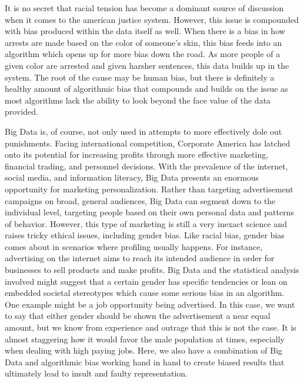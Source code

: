 \documentclass[sigconf]{acmart}
\begin{document}
It is no secret that racial tension has become a dominant source of discussion when it comes to the american justice system. However, this issue is compounded with bias produced within the data itself as well. When there is a bias in how arrests are made based on the color of someone's skin, this bias feeds into an algorithm which opens up for more bias down the road. As more people of a given color are arrested and given harsher sentences, this data builds up in the system. The root of the cause may be human bias, but there is definitely a healthy amount of algorithmic bias that compounds and builds on the issue as most algorithms lack the ability to look beyond the face value of the data provided\cite{Eckhouse2017}.

Big Data is, of course, not only used in attempts to more effectively dole out punishments. Facing international competition, Corporate America has latched onto its potential for increasing profits through more effective marketing, financial trading, and personnel decisions. With the prevalence of the internet, social media, and information literacy, Big Data presents an enormous opportunity for marketing personalization. Rather than targeting advertisement campaigns on broad, general audiences, Big Data can segment down to the individual level, targeting people based on their own personal data and patterns of behavior. However, this type of marketing is still a very inexact science and raises tricky ethical issues, including gender bias. Like racial bias, gender bias comes about in scenarios where profiling usually happens. For instance, advertising on the internet aims to reach its intended audience in order for businesses to sell products and make profits. Big Data and the statistical analysis involved might suggest that a certain gender has specific tendencies or lean on embedded societal stereotypes which cause some serious bias in an algorithm. One example might be a job opportunity being advertised. In this case, we want to say that either gender should be shown the advertisement a near equal amount, but we know from experience and outrage that this is not the case. It is almost staggering how it would favor the male population at times, especially when dealing with high paying jobs. Here, we also have a combination of Big Data and algorithmic bias working hand in hand to create biased results that ultimately lead to insult and faulty representation\cite{Brown2017}.
\end{document}
